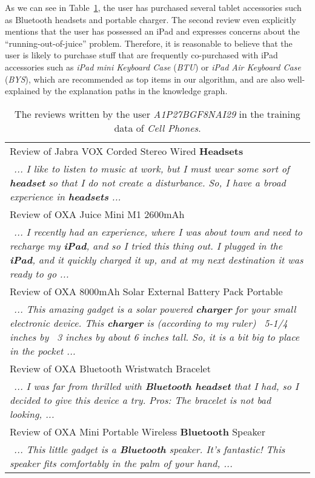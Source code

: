 \documentclass[algorithms,article,accept,moreauthors,pdftex,10pt,a4paper]{Definitions/mdpi}
\begin{document}
As we can see in Table~\ref{tab:user_review}, the user has purchased several tablet accessories such as Bluetooth headsets and portable charger.  
The second review even explicitly mentions that the user has possessed an iPad and expresses concerns about the ``running-out-of-juice'' problem.
Therefore, it is reasonable to believe that the user is likely to purchase stuff that are frequently co-purchased with iPad accessories such as \textit{iPad mini Keyboard Case} (\textit{BTU}) or \textit{iPad Air Keyboard Case} (\textit{BYS}), which are recommended as top items in our algorithm, and are also well-explained by the explanation paths in the knowledge graph.


\begin{table}[H]
	\centering
	\caption{The reviews written by the user \textit{A1P27BGF8NAI29} in the training data of \textit{Cell Phones}.}
	\begin{tabular}{p{15cm}}
\toprule
		Review of Jabra VOX Corded Stereo Wired \textbf{Headsets} \\ 
$~~$\textit{... I like to listen to music at work, but I must wear some sort of \textbf{headset} so that I do not create a disturbance. So, I have a broad experience in \textbf{headsets} ...}\\ 
\midrule
		Review of OXA Juice Mini M1 2600mAh \\
$~~$\textit{... I recently had an experience, where I was about town and need to recharge my \textbf{iPad}, and so I tried this thing out. I plugged in the \textbf{iPad}, and it quickly charged it up, and at my next destination it was ready to go ...}\\ \hline
Review of OXA 8000mAh Solar External Battery Pack Portable\\ 
$~~$\textit{... This amazing gadget is a solar powered \textbf{charger} for your small electronic device. This \textbf{charger} is (according to my ruler) ~5-1/4 inches by ~3 inches by about 6 inches tall. So, it is a bit big to place in the pocket ...}\\\hline 
Review of OXA Bluetooth Wristwatch Bracelet \\ 
$~~$\textit{... I was far from thrilled with \textbf{Bluetooth headset} that I had, so I decided to give this device a try. Pros: The bracelet is not bad looking, ...}\\ 
Review of OXA Mini Portable Wireless \textbf{Bluetooth} Speaker \\ 
$~~$\textit{... This little gadget is a \textbf{Bluetooth} speaker. It's fantastic! This speaker fits comfortably in the palm of your hand, ...}\\ 
\bottomrule
	\end{tabular}
	\label{tab:user_review}
\end{table}
\end{document}
